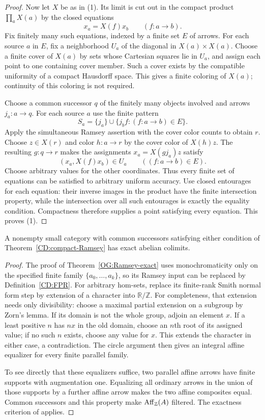 \begin{proof}
Now let $X$ be as in (1). Its limit is cut out in the compact product
$\prod_aX(a)$ by the closed equations
\[
 x_a=X(f)x_b\qquad(f:a\to b).
\]
Fix finitely many such equations, indexed by a finite set $E$ of
arrows. For each source $a$ in $E$, fix a neighborhood $U_a$ of the
diagonal in $X(a)\times X(a)$. Choose a finite cover of $X(a)$ by
sets whose Cartesian squares lie in $U_a$, and assign each point to
one containing cover member. Such a cover exists by the compatible
uniformity of a compact Hausdorff space. This gives a finite coloring
of $X(a)$; continuity of this coloring is not required.

Choose a common successor $q$ of the finitely many objects involved
and arrows $j_a:a\to q$. For each source $a$ use the finite pattern
\[
 S_a=\{j_a\}\cup\{j_bf:(f:a\to b)\in E\}.
\]
Apply the simultaneous Ramsey assertion with the cover color counts
to obtain $r$. Choose $z\in X(r)$ and color $h:a\to r$ by the cover
color of $X(h)z$. The resulting $g:q\to r$ makes the assignments
$x_a=X(gj_a)z$ satisfy
\[
 (x_a,X(f)x_b)\in U_a\qquad((f:a\to b)\in E).
\]
Choose arbitrary values for the other coordinates. Thus every finite
set of equations can be satisfied to arbitrary uniform accuracy.
Use closed entourages for each equation: their inverse images in the
product have the finite intersection property, while the intersection
over all such entourages is exactly the equality condition. Compactness
therefore supplies a point satisfying every equation. This proves (1).
\end{proof}

\begin{corollary}
\label{CD:compact-exact}
A nonempty small category with common successors satisfying either
condition of Theorem~\ref{CD:compact-Ramsey} has exact abelian colimits.
\end{corollary}
\begin{proof}
The proof of Theorem~\ref{OG:Ramsey-exact} uses monochromaticity only
on the specified finite family $\{a_0,\ldots,a_k\}$, so its Ramsey
input can be replaced by Definition~\ref{CD:FPR}. For arbitrary
hom-sets, replace its finite-rank Smith normal form step by extension
of a character into $\mathbb R/\mathbb Z$. For completeness, that
extension needs only divisibility: choose a maximal partial extension
on a subgroup by Zorn's lemma. If its domain is not the whole group,
adjoin an element $x$. If a least positive $n$ has $nx$ in the old
domain, choose an $n$th root of its assigned value; if no such $n$
exists, choose any value for $x$. This extends the character in either
case, a contradiction. The circle argument then gives an integral
affine equalizer for every finite parallel family.

To see directly that these equalizers suffice, two parallel affine
arrows have finite supports with augmentation one. Equalizing all
ordinary arrows in the union of those supports by a further affine
arrow makes the two affine composites equal. Common successors and
this property make $\operatorname{Aff}_\mathbb Z(A)$ filtered. The exactness criterion of
\citet[Theorem~3.1 and Proposition~3.3]{IsbellMitchell1976} applies.
\end{proof}

